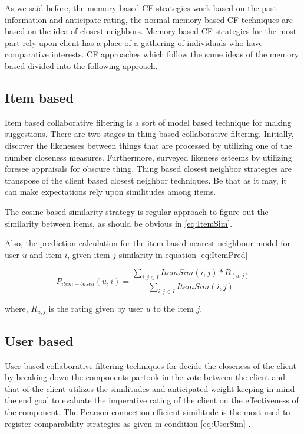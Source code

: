 \documentclass[10pt,conference]{IEEEtran}
\begin{document}
As we said before, the memory based CF strategies work based on the past information and anticipate rating, the normal memory based CF techniques are based on the idea of closest neighbors. Memory based CF strategies for the most part rely upon client has a place of a gathering of individuals who have comparative interests. CF approaches which follow the same ideas of the memory based divided into the following approach.

\subsection{Item based}
Item based collaborative filtering is a sort of model based technique for making suggestions. There are two stages in thing based collaborative filtering. Initially, discover the likenesses between things that are processed by utilizing one of the number closeness measures. Furthermore, surveyed likeness esteems by utilizing foresee appraisals for obscure thing. Thing based closest neighbor strategies are transpose of the client based closest neighbor techniques. Be that as it may, it can make expectations rely upon similitudes among items. 

The cosine based similarity strategy is regular approach to figure out the similarity between items, as should be obvious in \eqref{eq:ItemSim}.

Also, the prediction calculation for the item based nearest neighbour model for user $u$ and item $i$, given item $j$ similarity in equation \eqref{eq:ItemPred}


\begin{equation}
P_{item-based}(u,i) = \frac{\sum_{i,j \in I} ItemSim(i,j) \ast R_(u,j)} {\sum_{i,j \in I} ItemSim(i,j)}
\label{eq:ItemPred} \tag{5}
\end{equation}

where, $R_{u,j}$ is the rating given by user $u$ to the item $j$.

\subsection{User based}
User based collaborative filtering techniques for decide the closeness of the client by breaking down the components partook in the vote between the client and that of the client utilizes the similitudes and anticipated weight keeping in mind the end goal to evaluate the imperative rating of the client on the effectiveness of the component. The Pearson connection efficient similitude is the most used to register comparability strategies as given in condition \eqref{eq:UserSim} \cite{Claypool1999}.
\end{document}
